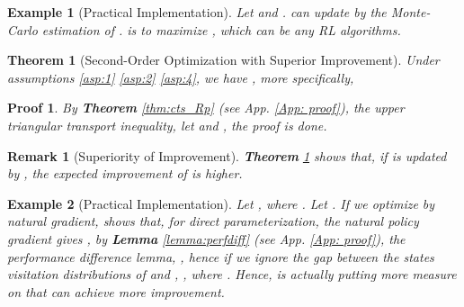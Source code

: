 \documentclass[nohyperref]{article}
\theoremstyle{plain}
\newtheorem{Theorem}{\textbf{Theorem}}
\newtheorem*{Remark}{\textbf{Remark}}
\newtheorem*{Proof}{\textbf{Proof}}
\newtheorem{Example}{Example}
\begin{document}
\begin{Example}[Practical Implementation]
Let  and .
     can update  by the Monte-Carlo estimation of .
     is to maximize , which can be any RL algorithms.
\end{Example}

\begin{Theorem}[Second-Order Optimization with Superior Improvement]
    Under assumptions \eqref{asp:1} \eqref{asp:2} \eqref{asp:4}, we have
    , more specifically,
   
\label{thm:2nd_gdi}
\end{Theorem}

\begin{Proof}
    By \textbf{Theorem} \ref{thm:cts_Rp} (see App. \ref{App: proof}), the upper triangular transport inequality,
    let  and 
    ,
    the proof is done.
\end{Proof}

\begin{Remark}[Superiority of Improvement]
    \textbf{Theorem} \ref{thm:2nd_gdi} shows that, if  is updated by , the expected improvement of  is higher.
\end{Remark}






\begin{Example}[Practical Implementation]
\label{example: GDI meta}
    Let , where .
    Let .
    If we optimize  by natural gradient, 
    \citep{pgtheory} shows that, for direct parameterization, the natural policy gradient gives , by \textbf{Lemma} \ref{lemma:perfdiff} (see App. \ref{App: proof}), the performance difference lemma,
    , 
    hence if we ignore the gap between the states visitation distributions of  and , 
    , 
    where .
    Hence,  is actually putting more measure on  that can achieve more improvement.
\end{Example}



\begin{figure*}[!t]
\caption{Figures of ablation study. \textbf{(a)} shows  how   the ablation groups (see App. \ref{Sec: appendix Ablation Study}) perform compared with the baseline (i.e., GDI-I). Noting that the performance has been normalized by GDI-I (e.g., ), and w/o  means without the meta-controller. \textbf{(b)} and \textbf{(c)} illustrate the  data richness (e.g., ) of GDI-I and GDI-I via t-SNE  of visited states (see App. \ref{app: tsne}).}
\label{fig:ablation study}
\end{figure*}
\end{document}
